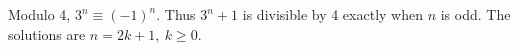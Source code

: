 Modulo 4, $3^n\equiv(-1)^n$. Thus $3^n+1$ is divisible by 4 exactly when $n$ is odd. The solutions are $\boxed{n=2k+1,\ k\ge0}$.
